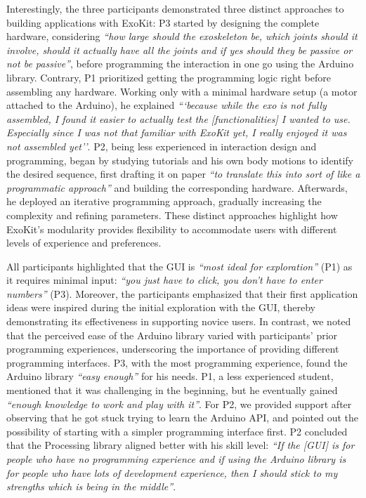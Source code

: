 Interestingly, the three participants demonstrated three distinct approaches to building applications with ExoKit:  
P3 started by designing the complete hardware, considering \textit{``how large should the exoskeleton be, which joints should it involve, should it actually have all the joints and if yes should they be passive or not be passive''}, before programming the interaction in one go using the Arduino library.  
Contrary, P1 prioritized getting the programming logic right before assembling any hardware. Working only with a minimal hardware setup (a motor attached to the Arduino), he explained \textit{```because while the exo is not fully assembled, I found it easier to actually test the [functionalities] I wanted to use. Especially since I was not that familiar with ExoKit yet, I really enjoyed it was not assembled yet''}. 
P2, being less experienced in interaction design and programming, began by studying tutorials and his own body motions to identify the desired sequence, first drafting it on paper \textit{``to translate this into sort of like a programmatic approach''} and building the corresponding hardware. Afterwards, he deployed an iterative programming approach, gradually increasing the complexity and refining parameters.  
These distinct approaches highlight how ExoKit's modularity provides flexibility to accommodate users with different levels of experience and preferences.  

All participants highlighted that the GUI is \textit{``most ideal for exploration''} (P1) as it requires minimal input: \textit{``you just have to click, you don't have to enter numbers''} (P3). Moreover, the participants emphasized that their first application ideas were inspired during the initial exploration with the GUI, thereby demonstrating its effectiveness in supporting novice users. 
In contrast, we noted that the perceived ease of the Arduino library varied with participants' prior programming experiences, underscoring the importance of providing different programming interfaces. P3, with the most programming experience, found the Arduino library \textit{``easy enough''} for his needs. P1, a less experienced student, mentioned that
it was challenging in the beginning, but he eventually gained \textit{``enough knowledge to work and play with it''}.
For P2, we provided support after observing that he got stuck trying to learn the Arduino API, and pointed out the possibility of starting with a simpler programming interface first. %
P2 concluded that the Processing library aligned better with his skill level: \textit{``If the [GUI] is for people who have no programming experience and if using the Arduino library is for people who have lots of development experience, then I should stick to my strengths which is being in the middle''}.


